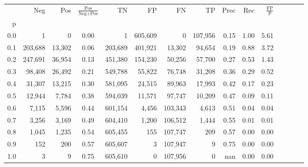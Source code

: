 \begin{tabular}{rrrcrrrrrrrrrrr}
\toprule
{} &      Neg &     Pos & $\frac{\text{Pos}}{\text{Neg}+\text{Pos}}$ &       TN &       FP &       FN &       TP &  Prec &   Rec & $\frac{\text{FP}}{\text{P}}$ \\
p   &          &         &                                            &          &          &          &          &       &       &                              \\
\midrule
0.0 &        1 &       0 &                                       0.00 &        1 &  605,609 &        0 &  107,956 &  0.15 &  1.00 &                         5.61 \\
0.1 &  203,688 &  13,302 &                                       0.06 &  203,689 &  401,921 &   13,302 &   94,654 &  0.19 &  0.88 &                         3.72 \\
0.2 &  247,691 &  36,954 &                                       0.13 &  451,380 &  154,230 &   50,256 &   57,700 &  0.27 &  0.53 &                         1.43 \\
0.3 &   98,408 &  26,492 &                                       0.21 &  549,788 &   55,822 &   76,748 &   31,208 &  0.36 &  0.29 &                         0.52 \\
0.4 &   31,307 &  13,215 &                                       0.30 &  581,095 &   24,515 &   89,963 &   17,993 &  0.42 &  0.17 &                         0.23 \\
0.5 &   12,944 &   7,784 &                                       0.38 &  594,039 &   11,571 &   97,747 &   10,209 &  0.47 &  0.09 &                         0.11 \\
0.6 &    7,115 &   5,596 &                                       0.44 &  601,154 &    4,456 &  103,343 &    4,613 &  0.51 &  0.04 &                         0.04 \\
0.7 &    3,256 &   3,169 &                                       0.49 &  604,410 &    1,200 &  106,512 &    1,444 &  0.55 &  0.01 &                         0.01 \\
0.8 &    1,045 &   1,235 &                                       0.54 &  605,455 &      155 &  107,747 &      209 &  0.57 &  0.00 &                         0.00 \\
0.9 &      152 &     200 &                                       0.57 &  605,607 &        3 &  107,947 &        9 &  0.75 &  0.00 &                         0.00 \\
1.0 &        3 &       9 &                                       0.75 &  605,610 &        0 &  107,956 &        0 &   nan &  0.00 &                         0.00 \\
\bottomrule
\end{tabular}
